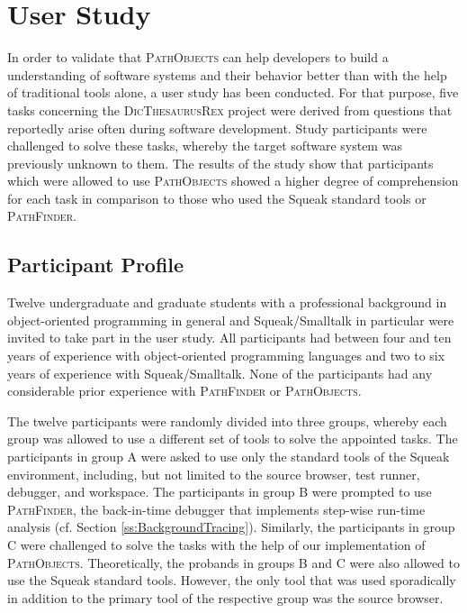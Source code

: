 \clearpage
\section{User Study}
\label{s:DiscussionEvaluation}
In order to validate that \textsc{PathObjects} can help developers to build a understanding of software systems and their behavior better than with the help of traditional tools alone, a user study has been conducted.
For that purpose, five tasks concerning the \textsc{DicThesaurusRex} project were derived from questions that reportedly arise often during software development.
Study participants were challenged to solve these tasks, whereby the target software system was previously unknown to them.
The results of the study show that participants which were allowed to use \textsc{PathObjects} showed a higher degree of comprehension for each task in comparison to those who used the Squeak standard tools or \textsc{PathFinder}.

\subsection{Participant Profile}
Twelve undergraduate and graduate students with a professional background in object-oriented programming in general and Squeak/Smalltalk in particular were invited to take part in the user study.
All participants had between four and ten years of experience with object-oriented programming languages and two to six years of experience with Squeak/Smalltalk.
None of the participants had any considerable prior experience with \textsc{PathFinder} or \textsc{PathObjects}.

The twelve participants were randomly divided into three groups, whereby each group was allowed to use a different set of tools to solve the appointed tasks.
The participants in group A were asked to use only the standard tools of the Squeak environment, including, but not limited to the source browser, test runner, debugger, and workspace.
The participants in group B were prompted to use \textsc{PathFinder}, the back-in-time debugger that implements step-wise run-time analysis (cf. Section \ref{ss:BackgroundTracing}).
Similarly, the participants in group C were challenged to solve the tasks with the help of our implementation of \textsc{PathObjects}.
Theoretically, the probands in groups B and C were also allowed to use the Squeak standard tools.
However, the only tool that was used sporadically in addition to the primary tool of the respective group was the source browser.

